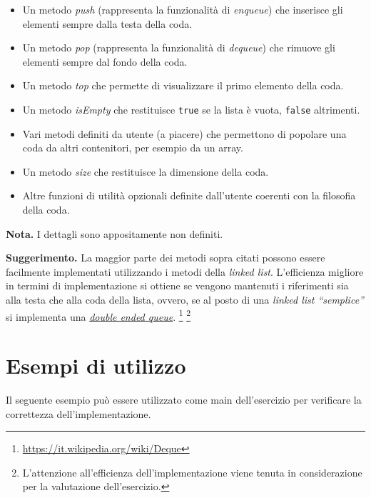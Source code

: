 \documentclass[addpoints,12pt,answers]{exam}
\begin{document}
    \begin{itemize}
        \item Un metodo \emph{push} (rappresenta la funzionalità di
          \emph{enqueue}) che inserisce gli elementi sempre dalla
          testa della coda.
        \item Un metodo \emph{pop} (rappresenta la funzionalità di
          \emph{dequeue}) che rimuove gli elementi sempre dal fondo
          della coda.
        \item Un metodo \emph{top} che permette di visualizzare il
          primo elemento della coda.
        \item Un metodo \emph{isEmpty} che restituisce \texttt{true}
          se la lista è vuota, \texttt{false} altrimenti.
        \item Vari metodi definiti da utente (a piacere) che
          permettono di popolare una coda da altri contenitori, per
          esempio da un array.
        \item Un metodo \emph{size} che restituisce la dimensione
          della coda.
        \item Altre funzioni di utilità opzionali definite 
          dall'utente coerenti con la filosofia della coda.
    \end{itemize}

    \noindent\textbf{Nota.} I dettagli sono appositamente non definiti.

    \noindent\textbf{Suggerimento.} La maggior parte dei metodi sopra
    citati possono essere facilmente implementati utilizzando i metodi
    della \emph{linked list}. L'efficienza migliore in termini di
    implementazione si ottiene se vengono mantenuti i riferimenti sia
    alla testa che alla coda della lista, ovvero, se al posto di una
    \emph{linked list ``semplice''} si implementa una
    \emph{\href{https://it.wikipedia.org/wiki/Deque}{double ended
        queue}}.
    \footnote{\href{https://it.wikipedia.org/wiki/Deque}{https://it.wikipedia.org/wiki/Deque}}
    \footnote{L'attenzione all'efficienza dell'implementazione viene
      tenuta in considerazione per la valutazione dell'esercizio.}

   
    \section{Esempi di utilizzo}

    Il seguente esempio può essere utilizzato come main dell'esercizio
    per verificare la correttezza dell'implementazione.
    
\end{document}
